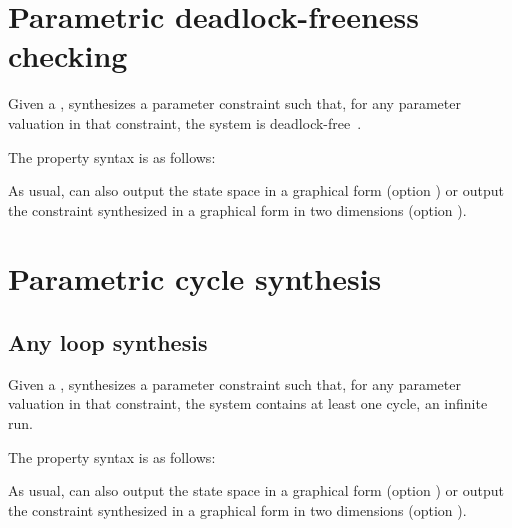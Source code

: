 \section{Parametric deadlock-freeness checking}\label{ss:mode:PDFC}

Given a \NIPTA{}, \PDFC{} synthesizes a parameter constraint such that, for any parameter valuation in that constraint, the system is deadlock-free~\cite{Andre16}.

The property syntax is as follows:


As usual, \imitator{} can also
output the state space in a graphical form (option )
or
output the constraint synthesized in a graphical form in two dimensions (option ).


\section{Parametric cycle synthesis}\label{ss:mode:LoopSynth}

\subsection{Any loop synthesis}\label{ss:loop}


Given a \NIPTA{}, \imitator{} synthesizes a parameter constraint such that, for any parameter valuation in that constraint, the system contains at least one cycle, \ie{} an infinite run. %

%

The property syntax is as follows:



As usual, \imitator{} can also
output the state space in a graphical form (option )
or
output the constraint synthesized in a graphical form in two dimensions (option ).

